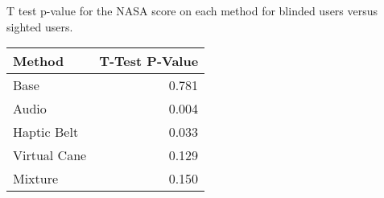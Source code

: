 
\centering
\caption{T test p-value for the NASA score on each method for blinded users versus sighted users.}
\label{tab:ttest_nasa_score}
\begin{tabular}{lr}
\toprule
      Method &  T-Test P-Value \\
\midrule
        Base &           0.781 \\
       Audio &           0.004 \\
 Haptic Belt &           0.033 \\
Virtual Cane &           0.129 \\
     Mixture &           0.150 \\
\bottomrule
\end{tabular}
